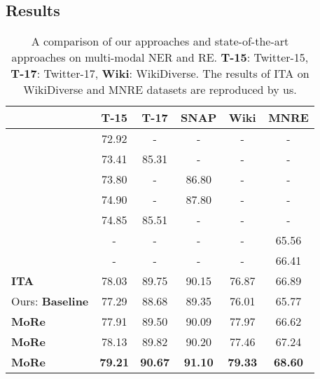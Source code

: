 \documentclass[11pt]{article}
\begin{document}
\subsection{Results}
\begin{table}[t!]
\small
\setlength\tabcolsep{3pt}
\centering
\begin{tabular}{l|ccccc}
\toprule
          & T-15 & T-17 & SNAP  & Wiki & MNRE    \\
\midrule
\citet{10.1145/3394171.3413650} & 72.92 & - & - & - & - \\
\citet{yu-etal-2020-improving-multimodal} & 73.41 & 85.31 & - & - & -\\
\citet{sun-etal-2020-riva} & 73.80 & - & 86.80  & - & -\\ 
\citet{Sun2021RpBERTAT} &74.90 & - & 87.80 & - & - \\
\citet{zhang2021multi} & 74.85 & 85.51 & -  & - & -\\
\citet{zheng2021mnre} & -  & - & - & - & 65.56\\
\citet{zheng2021multimodal} & - & - & - & - & 66.41\\
{\textbf{ITA}} & 78.03 & 89.75 & 90.15 & 76.87 & 66.89 \\
Ours: \textbf{Baseline}  & 77.29     & 88.68     & 89.35 & 76.01      & 65.77 \\
\textbf{MoRe} & 77.91     & 89.50     & 90.09 & 77.97      & 66.62 \\
\textbf{MoRe}  & 78.13     & 89.82     & 90.20 & 77.46      & 67.24 \\
\textbf{MoRe}       & \textbf{79.21}     & \textbf{90.67}     & \textbf{91.10} & \textbf{79.33}      & \textbf{68.60} \\
\bottomrule
\end{tabular}
\caption{A comparison of our approaches and state-of-the-art approaches on multi-modal NER and RE. \textbf{T-15}: Twitter-15, \textbf{T-17}: Twitter-17, \textbf{Wiki}: WikiDiverse. The results of ITA on WikiDiverse and MNRE datasets are reproduced by us.}
\label{tab:main}
\end{table}
\end{document}
